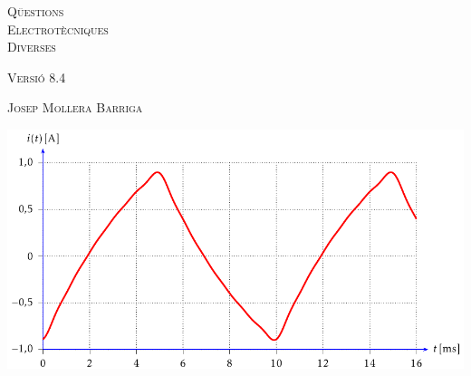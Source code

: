 \begin{titlepage}

   \parbox{18cm}{\fontsize{60pt}{60pt}\selectfont\color{NavyBlue}\scshape%
                 Q\"{u}estions\\[30pt] Electrot\`{e}cniques\\[30pt] Diverses}

   \vspace*{1.8cm}
   {\fontsize{30pt}{30pt}\selectfont\textsc{Versi\'{o} 8.4}}

   \vspace*{1.5cm}
   {\fontsize{40pt}{40pt}\selectfont\textsc{Josep Mollera Barriga}}

   \vspace*{1cm}
   \centering
   \includegraphics{Imatges/Cap-Fourier-Exemple-Corrent.pdf}

\end{titlepage}
